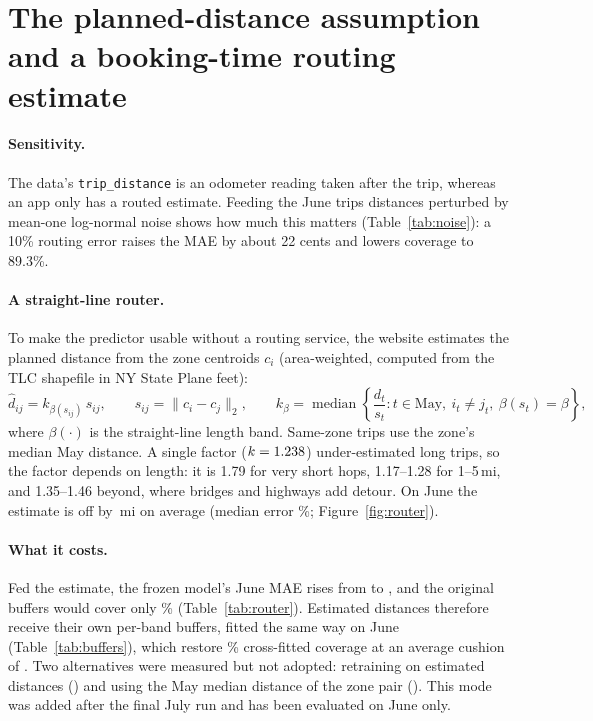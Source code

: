 \documentclass[11pt,a4paper]{article}
\newcommand{\POSNUM}[1]{#1}\newcommand{\NEGNUM}[1]{\textminus#1}
\newcommand{\money}[1]{{\renewcommand{\POSNUM}[1]{\$##1}\renewcommand{\NEGNUM}[1]{\textminus\$##1}#1}}%
\newcommand{\code}[1]{\texttt{#1}}
\begin{document}
\section{The planned-distance assumption and a booking-time routing estimate}\label{sec:routing}
\paragraph{Sensitivity.} The data's \code{trip\_distance} is an odometer reading taken after the trip, whereas an app only has a routed estimate. Feeding the June trips distances perturbed by mean-one log-normal noise shows how much this matters (Table~\ref{tab:noise}): a 10\% routing error raises the MAE by about 22 cents and lowers coverage to 89.3\%.
\TableNoise

\paragraph{A straight-line router.} To make the predictor usable without a routing service, the website estimates the planned distance from the zone centroids $c_i$ (area-weighted, computed from the TLC shapefile in NY State Plane feet):
\begin{equation}
 \hat d_{ij} = k_{\beta(s_{ij})}\, s_{ij},\qquad s_{ij} = \lVert c_i - c_j\rVert_2, \qquad
 k_\beta = \operatorname{median}\left\{\frac{d_t}{s_t} : t\in\text{May},\ i_t\ne j_t,\ \beta(s_t)=\beta\right\},
\end{equation}
where $\beta(\cdot)$ is the straight-line length band. Same-zone trips use the zone's median May distance. A single factor ($k=\RouterK$) under-estimated long trips, so the factor depends on length: it is 1.79 for very short hops, 1.17--1.28 for 1--5\,mi, and 1.35--1.46 beyond, where bridges and highways add detour. On June the estimate is off by \RouterDistMae{}\,mi on average (median error \RouterDistMape\%; Figure~\ref{fig:router}).

\paragraph{What it costs.} Fed the estimate, the frozen model's June MAE rises from \money{\RouterOdoMae} to \money{\RouterEstMae}, and the original buffers would cover only \RouterEstCov\% (Table~\ref{tab:router}). Estimated distances therefore receive their own per-band buffers, fitted the same way on June (Table~\ref{tab:buffers}), which restore \RouterXfitCov\% cross-fitted coverage at an average cushion of \money{\RouterXfitCushion}. Two alternatives were measured but not adopted: retraining on estimated distances (\money{\RouterRetrainedMae}) and using the May median distance of the zone pair (\money{\RouterPairMae}). This mode was added after the final July run and has been evaluated on June only.
\TableRouter
\end{document}
